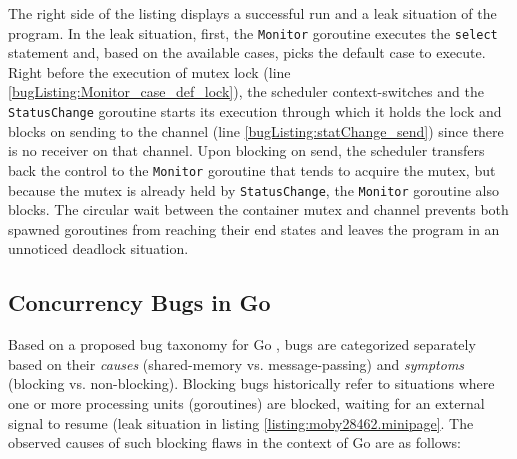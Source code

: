 %
The right side of the listing displays a successful run and a leak situation of the program.
%
In the leak situation, first, the \texttt{Monitor} goroutine executes the \texttt{select} statement and, based on the available cases, picks the default case to execute.
%
Right before the execution of mutex lock (line \ref{bugListing:Monitor_case_def_lock}), the scheduler context-switches and the \texttt{StatusChange} goroutine starts its execution through which it holds the lock and blocks on sending to the channel (line \ref{bugListing:statChange_send}) since there is no receiver on that channel.
%
Upon blocking on send, the scheduler transfers back the control to the \texttt{Monitor} goroutine that tends to acquire the mutex, but because the mutex is already held by \texttt{StatusChange}, the \texttt{Monitor} goroutine also blocks.
%
The circular wait between the container mutex and channel prevents both spawned goroutines from reaching their end states and leaves the program in an unnoticed deadlock situation.
%
%
%
%


\subsection{Concurrency Bugs in Go}
\label{sec:goBugs}
Based on a proposed bug taxonomy for Go \cite{tu-concurrentBugs-asplos19}, bugs are categorized separately based on their \textit{causes} (shared-memory vs. message-passing) and \textit{symptoms} (blocking vs. non-blocking).
%
Blocking bugs historically refer to situations where one or more processing units (\eg goroutines) are blocked, waiting for an external signal to resume (\eg leak situation in listing \ref{listing:moby28462.minipage}.
%
The observed causes of such blocking flaws in the context of Go are as follows:

